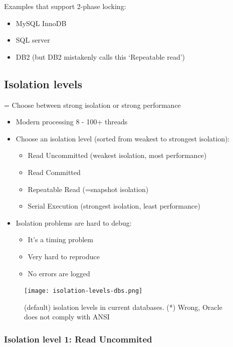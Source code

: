 \documentclass{article}
\begin{document}
Examples that support 2-phase locking:

\begin{itemize}
    \item MySQL InnoDB
    \item SQL server
    \item DB2 (but DB2 mistakenly calls this `Repeatable read')
\end{itemize}

\subsection{Isolation levels}

= Choose between strong isolation or strong performance

\begin{itemize}
    \item Modern processing 8 - 100+ threads
    \item Choose an isolation level (sorted from weakest to strongest isolation):
    \begin{itemize}
        \item Read Uncommitted (weakest isolation, most performance)
        \item Read Committed
        \item Repeatable Read (=snapshot isolation)
        \item Serial Execution (strongest isolation, least performance)
    \end{itemize}
    \item Isolation problems are hard to debug:
    \begin{itemize}
        \item It's a timing problem
        \item Very hard to reproduce
        \item No errors are logged
    \end{itemize}
\end{itemize}

\begin{figure}[H]
    \centering
    \texttt{[image: isolation-levels-dbs.png]}
    \caption{(default) isolation levels in current databases. (*) Wrong, Oracle does not comply with ANSI}
\end{figure}


\subsubsection{Isolation level 1: Read Uncommited}
\end{document}
